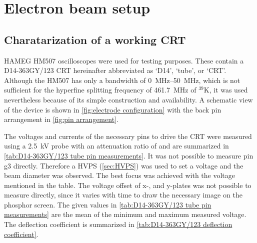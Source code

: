 \chapter{Electron beam setup}\label{ch:Electron beam setup}

\section{Charatarization of a working CRT}\label{sec:Charatarization of a working CRT}

HAMEG HM507 oscilloscopes \autocite{HM507-manual} were used for testing purposes. These contain a D14-363GY/123\autocite{D14363GY123-manual} CRT hereinafter abbreviated as `D14', `tube', or `CRT'. Although the HM507 has only a bandwidth of \SIrange{0}{50}{\mega\hertz}, which is not sufficient for the hyperfine splitting frequency of \SI{461.7}{\mega\hertz} of $^{39}\mathrm{K}$, it was used nevertheless because of its simple construction and availability. A schematic view of the device is shown in \cref{fig:electrode configuration} with the back pin arrangement in \cref{fig:pin arrangement}.

The voltages and currents of the necessary pins to drive the CRT were measured using a \SI{2.5}{\kilo\volt} probe  with an attenuation ratio of  and are summarized in \cref{tab:D14-363GY/123 tube pin measurements}. It was not possible to measure pin g3 directly. Therefore a HVPS (\cref{sec:HVPS}) was used to set a voltage and the beam diameter was observed. The best focus was achieved with the voltage mentioned in the table. The voltage offset of x-, and y-plates was not possible to measure directly, since it varies with time to draw the necessary image on the phosphor screen. The given values in \cref{tab:D14-363GY/123 tube pin measurements} are the mean of the minimum and maximum measured voltage. The deflection coefficient is summarized in \cref{tab:D14-363GY/123 deflection coefficient}.

